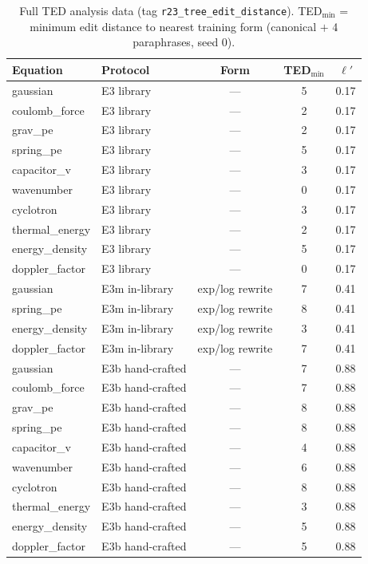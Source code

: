 \begin{table}[h]
\centering
\footnotesize
\caption{Full TED analysis data (tag \texttt{r23\_tree\_edit\_distance}). TED$_{\min}$ = minimum edit distance to nearest training form (canonical $+$ 4 paraphrases, seed 0).}
\label{tab:ted_full}
\begin{tabular}{llccc}
\toprule
Equation & Protocol & Form & TED$_{\min}$ & $\ell'$ \\
\midrule
gaussian & E3 library & --- & 5 & 0.17 \\
coulomb\_force & E3 library & --- & 2 & 0.17 \\
grav\_pe & E3 library & --- & 2 & 0.17 \\
spring\_pe & E3 library & --- & 5 & 0.17 \\
capacitor\_v & E3 library & --- & 3 & 0.17 \\
wavenumber & E3 library & --- & 0 & 0.17 \\
cyclotron & E3 library & --- & 3 & 0.17 \\
thermal\_energy & E3 library & --- & 2 & 0.17 \\
energy\_density & E3 library & --- & 5 & 0.17 \\
doppler\_factor & E3 library & --- & 0 & 0.17 \\
\midrule
gaussian & E3m in-library & exp/log rewrite & 7 & 0.41 \\
spring\_pe & E3m in-library & exp/log rewrite & 8 & 0.41 \\
energy\_density & E3m in-library & exp/log rewrite & 3 & 0.41 \\
doppler\_factor & E3m in-library & exp/log rewrite & 7 & 0.41 \\
\midrule
gaussian & E3b hand-crafted & --- & 7 & 0.88 \\
coulomb\_force & E3b hand-crafted & --- & 7 & 0.88 \\
grav\_pe & E3b hand-crafted & --- & 8 & 0.88 \\
spring\_pe & E3b hand-crafted & --- & 8 & 0.88 \\
capacitor\_v & E3b hand-crafted & --- & 4 & 0.88 \\
wavenumber & E3b hand-crafted & --- & 6 & 0.88 \\
cyclotron & E3b hand-crafted & --- & 8 & 0.88 \\
thermal\_energy & E3b hand-crafted & --- & 3 & 0.88 \\
energy\_density & E3b hand-crafted & --- & 5 & 0.88 \\
doppler\_factor & E3b hand-crafted & --- & 5 & 0.88 \\
\bottomrule
\end{tabular}
\end{table}


